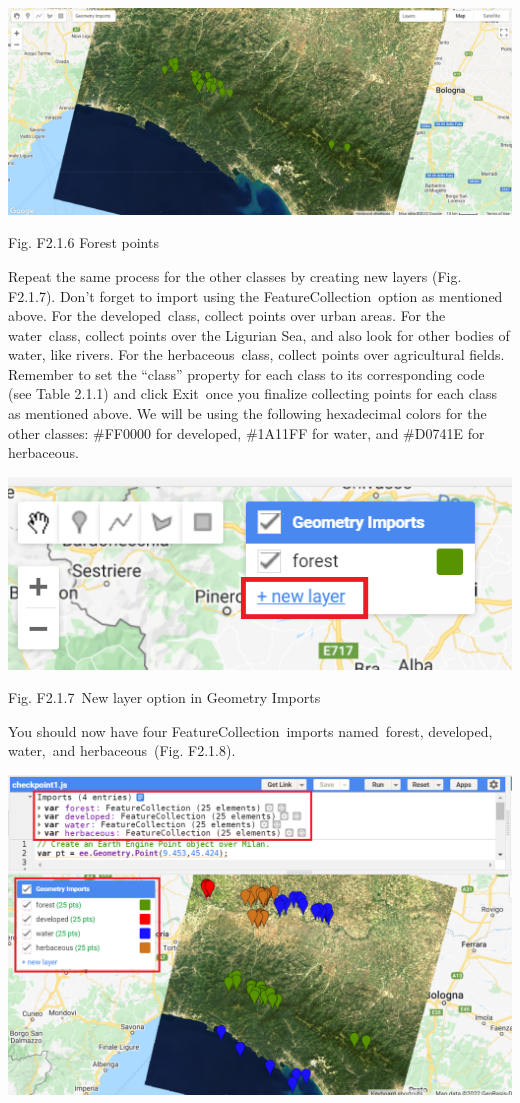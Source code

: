 \documentclass[
  letterpaper,
  DIV=11,
  numbers=noendperiod]{scrreprt}
\begin{document}
\includegraphics{./F2/image38.png}

Fig. F2.1.6 Forest points

Repeat the same process for the other classes by creating new layers
(Fig. F2.1.7). Don't forget to import using the FeatureCollection~option
as mentioned above. For the developed~class, collect points over urban
areas. For the water~class, collect points over the Ligurian Sea, and
also look for other bodies of water, like rivers. For the
herbaceous~class, collect points over agricultural fields. Remember to
set the ``class'' property for each class to its corresponding code (see
Table 2.1.1) and click Exit~once you finalize collecting points for each
class as mentioned above. We will be using the following hexadecimal
colors for the other classes: \#FF0000 for developed, \#1A11FF for
water, and \#D0741E for herbaceous.~

\includegraphics{./F2/image41.png}

Fig. F2.1.7~New layer option in Geometry Imports

You should now have four FeatureCollection~imports named~forest,
developed, water,~and herbaceous~(Fig. F2.1.8).

\includegraphics{./F2/image42.png}
\end{document}
